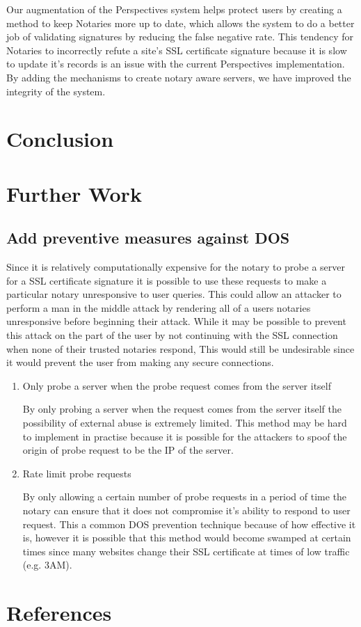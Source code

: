 \documentclass[preprint,review,12pt]{elsarticle}
\begin{document}
Our augmentation of the Perspectives system helps protect users by creating a
method to keep Notaries more up to date, which allows the system to do a better
job of validating signatures by reducing the false negative rate. This tendency
for Notaries to incorrectly refute a site's SSL certificate signature because
it is slow to update it's records is an issue with the current Perspectives
implementation. By adding the mechanisms to create notary aware servers, we
have improved the integrity of the system.

\section{Conclusion}
\label{conclusion}

\section{Further Work}
\label{further work}

\subsection{Add preventive measures against DOS}

Since it is relatively computationally expensive for the notary to probe a
server for a SSL certificate signature it is possible to use these requests to
make a particular notary unresponsive to user queries. This could allow an
attacker to perform a man in the middle attack by rendering all of a users
notaries unresponsive before beginning their attack. While it may be possible
to prevent this attack on the part of the user by not continuing with the SSL
connection when none of their trusted notaries respond, This would still be
undesirable since it would prevent the user from making any secure connections.

\begin{enumerate}
    \item {Only probe a server when the probe request comes from the server itself}

        By only probing a server when the request comes from the server itself
        the possibility of external abuse is extremely limited. This method may
        be hard to implement in practise because it is possible for the
        attackers to spoof the origin of probe request to be the IP of the
        server.

    \item {Rate limit probe requests}

        By only allowing a certain number of probe requests in a period of time
        the notary can ensure that it does not compromise it's ability to
        respond to user request. This a common DOS prevention technique because
        of how effective it is, however it is possible that this method would
        become swamped at certain times since many websites change their SSL
        certificate at times of low traffic (e.g. 3AM).

\end{enumerate}

\section{References}
\label{references}
\nocite{*}


\end{document}
